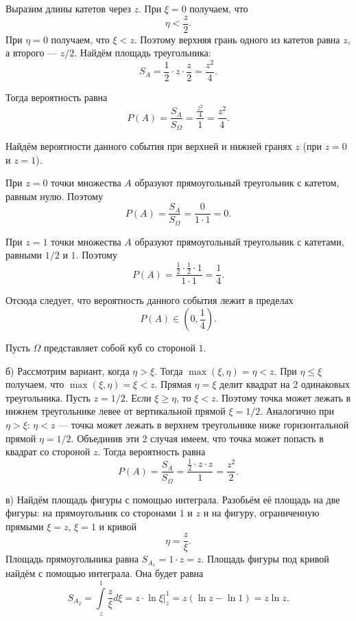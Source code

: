 \documentclass{book}
\begin{document}
Выразим длины катетов через $z$.
При $ \xi = 0$ получаем, что
$$ \eta < \frac{z}{2}.$$
При $ \eta = 0$ получаем, что $ \xi < z$.
Поэтому верхняя грань одного из катетов равна $z$, а второго --- $z/2$.
Найдём площадь треугольника:
$$S_A =
\frac{1}{2} \cdot z \cdot \frac{z}{2} =
\frac{z^2}{4}.$$

Тогда вероятность равна
$$P \left( A \right) =
\frac{S_A}{S_{ \Omega }} =
\frac{ \frac{z^2}{4} }{1} =
\frac{z^2}{4}.$$

Найдём вероятности данного события при верхней и нижней гранях $z$ (при $z=0$ и $z=1$).

При $z=0$ точки множества $A$ образуют прямоугольный треугольник с катетом, равным нулю.
Поэтому
$$P \left( A \right) =
\frac{S_A}{S_{ \Omega }} =
\frac{0}{1 \cdot 1} =
0.$$

При $z=1$ точки множества $A$ образуют прямоугольный треугольник с катетами, равными $1/2$ и $1$.
Поэтому
$$P \left( A \right) =
\frac{ \frac{1}{2} \cdot \frac{1}{2} \cdot 1}{1 \cdot 1} =
\frac{1}{4}.$$

Отсюда следует, что вероятность данного события лежит в пределах
$$P \left( A \right) \in \left( 0, \frac{1}{4} \right).$$

Пусть $ \Omega $ представляет собой куб со стороной $1$.

б) Рассмотрим вариант, когда $ \eta > \xi $.
Тогда $ \max \left( \xi, \eta \right) = \eta < z$.
При $ \eta \leq \xi $ получаем, что $ \max \left( \xi, \eta \right) = \xi < z$.
Прямая $ \eta = \xi $ делит квадрат на 2 одинаковых треугольника.
Пусть $z = 1/2$.
Если $ \xi \geq \eta $, то $ \xi < z$.
Поэтому точка может лежать в нижнем треугольнике левее от вертикальной прямой $ \xi = 1/2$.
Аналогично при $ \eta > \xi : \, \eta < z$ --- точка может лежать в верхнем треугольнике ниже горизонтальной прямой $ \eta = 1/2$.
Объединив эти 2 случая имеем, что точка может попасть в квадрат со стороной $z$.
Тогда вероятность равна
$$P \left( A \right) =
\frac{S_A}{S_{ \Omega }} =
\frac{ \frac{1}{2} \cdot z \cdot z}{1} =
\frac{z^2}{2}.$$

в) Найдём площадь фигуры с помощью интеграла.
Разобьём её площадь на две фигуры: на прямоугольник со сторонами $1$ и $z$ и на фигуру, ограниченную прямыми $ \xi = z, \, \xi = 1$ и кривой
$$ \eta =
\frac{z}{ \xi }.$$
Площадь прямоугольника равна $S_{A_1} = 1 \cdot z = z$.
Площадь фигуры под кривой найдём с помощью интеграла.
Она будет равна
$$S_{A_2} =
\int \limits_{z}^1 \frac{z}{ \xi } d \xi =
\left. z \cdot \ln \xi \right|_z^1 =
z \left( \ln z - \ln 1 \right) =
z \ln z.$$
\end{document}
